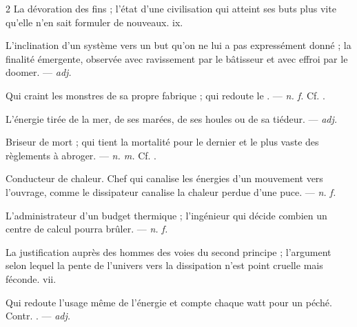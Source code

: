 \begin{multicols}{2}
 La dévoration des fins ; l'état d'une civilisation qui atteint ses buts plus vite qu'elle n'en sait formuler de nouveaux.   ix.

 L'inclination d'un système vers un but qu'on ne lui a pas expressément donné ; la finalité émergente, observée avec ravissement par le bâtisseur et avec effroi par le doomer. —  \textit{adj.}

 Qui craint les monstres de sa propre fabrique ; qui redoute le . —  \textit{n. f.} Cf. .

 L'énergie tirée de la mer, de ses marées, de ses houles ou de sa tiédeur. —  \textit{adj.}

 Briseur de mort ; qui tient la mortalité pour le dernier et le plus vaste des règlements à abroger.  —  \textit{n. m.} Cf. .

  Conducteur de chaleur.   Chef qui canalise les énergies d'un mouvement vers l'ouvrage, comme le dissipateur canalise la chaleur perdue d'une puce. —  \textit{n. f.}

 L'administrateur d'un budget thermique ; l'ingénieur qui décide combien un centre de calcul pourra brûler. —  \textit{n. f.}

 La justification auprès des hommes des voies du second principe ; l'argument selon lequel la pente de l'univers vers la dissipation n'est point cruelle mais féconde.   vii.

 Qui redoute l'usage même de l'énergie et compte chaque watt pour un péché. Contr. . —  \textit{adj.}


\end{multicols}
